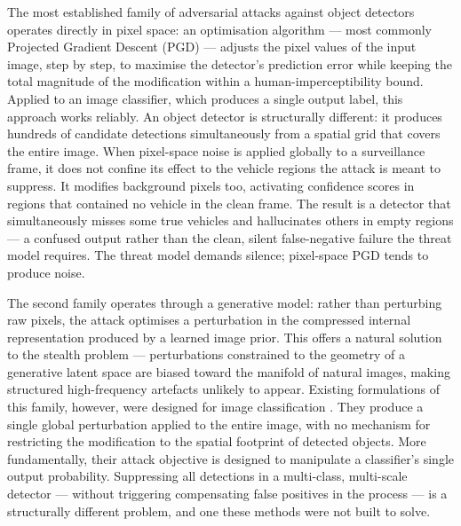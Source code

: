 \documentclass[12pt,a4paper]{report}
\begin{document}
The most established family of adversarial attacks against object
detectors operates directly in pixel space: an optimisation
algorithm --- most commonly Projected Gradient Descent
(PGD) \cite{madry2018towards} --- adjusts the pixel values of the
input image, step by step, to maximise the detector's prediction
error while keeping the total magnitude of the modification within
a human-imperceptibility bound. Applied to an image classifier,
which produces a single output label, this approach works
reliably. An object detector is structurally different: it
produces hundreds of candidate detections simultaneously from a
spatial grid that covers the entire image. When pixel-space noise
is applied globally to a surveillance frame, it does not confine
its effect to the vehicle regions the attack is meant to suppress.
It modifies background pixels too, activating confidence scores in
regions that contained no vehicle in the clean frame. The result
is a detector that simultaneously misses some true vehicles and
hallucinates others in empty regions --- a confused output rather
than the clean, silent false-negative failure the threat model
requires. The threat model demands silence; pixel-space PGD tends
to produce noise.

The second family operates through a generative model: rather than
perturbing raw pixels, the attack optimises a perturbation in the
compressed internal representation produced by a learned image
prior. This offers a natural solution to the stealth problem ---
perturbations constrained to the geometry of a generative latent
space are biased toward the manifold of natural images, making
structured high-frequency artefacts unlikely to appear. Existing
formulations of this family, however, were designed for image
classification \cite{xue2023diffusion}. They produce a single
global perturbation applied to the entire image, with no mechanism
for restricting the modification to the spatial footprint of
detected objects. More fundamentally, their attack objective is
designed to manipulate a classifier's single output probability.
Suppressing all detections in a multi-class, multi-scale detector
--- without triggering compensating false positives in the process
--- is a structurally different problem, and one these methods
were not built to solve.
\end{document}
